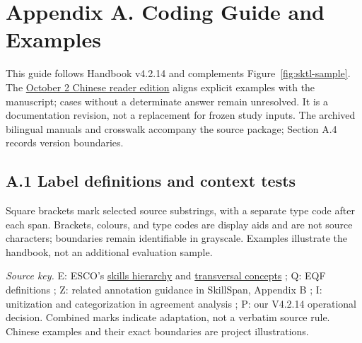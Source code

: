 \newcommand{\gspan}[2]{{\setlength{\fboxsep}{1.4pt}\colorbox{guide#1}{\strut [#2]\,\textsf{[#1]}}}}
\newcommand{\gcontext}[1]{\textcolor{black!75}{#1}}
\newcommand{\gsource}[1]{\,\textsuperscript{\textsf{[#1]}}}

\section{Appendix A. Coding Guide and Examples}
\label{app:a}
\label{sec:handbook-current}
This guide follows Handbook v4.2.14 and complements Figure~\ref{fig:sktl-sample}. The \href{https://github.com/AlfredJamesLi/chinese-skillspan-benchmark/blob/main/notes/handbooks/reader_20261002/README.md}{October 2 Chinese reader edition} aligns explicit examples with the manuscript; cases without a determinate answer remain unresolved. It is a documentation revision, not a replacement for frozen study inputs. The archived bilingual manuals and crosswalk accompany the source package; Section A.4 records version boundaries.

\subsection{A.1 Label definitions and context tests}
Square brackets mark selected source substrings, with a separate type code after each span. Brackets, colours, and type codes are display aids and are not source characters; boundaries remain identifiable in grayscale. Examples illustrate the handbook, not an additional evaluation sample.

\noindent\textit{Source key.} E: ESCO's \href{https://esco.ec.europa.eu/en/about-esco/escopedia/escopedia/skills-pillar}{skills hierarchy} and \href{https://esco.ec.europa.eu/en/about-esco/escopedia/escopedia/transversal-knowledge-skills-and-competences}{transversal concepts} \citep{ESCOv1_2_2024}; Q: EQF definitions \citep{council2017eqf}; Z: related annotation guidance in SkillSpan, Appendix B \citep{zhang2022skillspan}; I: unitization and categorization in agreement analysis \citep{artstein2008agreement}; P: our V4.2.14 operational decision. Combined marks indicate adaptation, not a verbatim source rule. Chinese examples and their exact boundaries are project illustrations.

